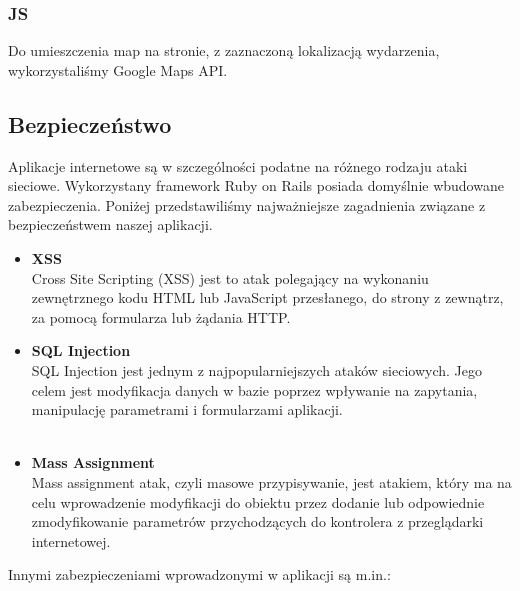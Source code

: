       \subsubsection{JS}
      Do umieszczenia map na stronie, z zaznaczoną lokalizacją wydarzenia, wykorzystaliśmy Google Maps API.

      

    \subsection{Bezpieczeństwo}
    Aplikacje internetowe są w szczególności podatne na różnego rodzaju ataki sieciowe. Wykorzystany framework Ruby on Rails posiada domyślnie wbudowane zabezpieczenia. Poniżej przedstawiliśmy najważniejsze zagadnienia związane z bezpieczeństwem naszej aplikacji.
      \begin{itemize}
        \item \textbf{XSS}\\ 
        Cross Site Scripting (XSS) jest to atak polegający na wykonaniu zewnętrznego kodu HTML lub JavaScript przesłanego, do strony z zewnątrz, za pomocą formularza lub żądania HTTP.

        
        \clearpage
        \item \textbf{SQL Injection}\\ 
        SQL Injection jest jednym z najpopularniejszych ataków sieciowych. Jego celem jest modyfikacja danych w bazie poprzez wpływanie na zapytania, manipulację parametrami i formularzami aplikacji.\\\\
        

        \item \textbf{Mass Assignment} \\ 
        Mass assignment atak, czyli masowe przypisywanie, jest atakiem, który ma na celu wprowadzenie modyfikacji do obiektu przez dodanie lub odpowiednie zmodyfikowanie parametrów przychodzących do kontrolera z przeglądarki internetowej.\\
        
      \end{itemize}
    Innymi zabezpieczeniami wprowadzonymi w aplikacji są m.in.:
